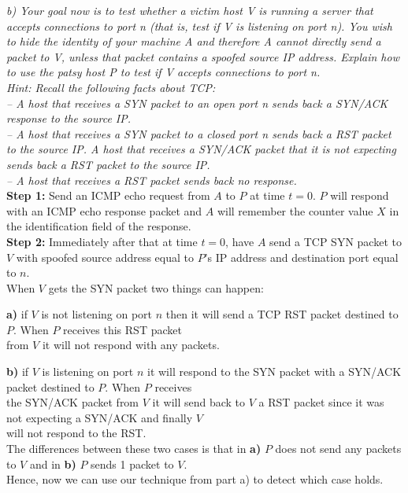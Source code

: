 \noindent \textit{b) Your goal now is to test whether a victim host V is running a server that accepts connections to port n (that is, test if V is listening on port n). You wish to hide the identity of your machine A and therefore A cannot directly send a packet to V, unless that packet contains a spoofed source IP address. Explain how to use the patsy host P to test if V accepts connections to port n.\\
Hint: Recall the following facts about TCP:\\
-- A host that receives a SYN packet to an open port n sends back a SYN/ACK response to the source IP.\\
-- A host that receives a SYN packet to a closed port n sends back a RST packet to the source IP.
A host that receives a SYN/ACK packet that it is not expecting sends back a RST packet to the source IP.\\
-- A host that receives a RST packet sends back no response. }\\

\noindent\textbf{Step 1: } Send an ICMP echo request from $A$ to $P$ at time $t=0$. $P$ will respond with an ICMP echo response packet and $A$ will remember the counter value $X$ in the identification field of the response.\\
\noindent\textbf{Step 2: } Immediately after that at time $t=0$, have $A$ send a TCP SYN packet to $V$ with spoofed source address equal to $P$'s IP address and destination port equal to $n$.\\

When $V$ gets the SYN packet two things can happen: 

\textbf{a)} if $V$ is not listening on port $n$ then it will send a TCP RST packet destined to $P$. When $P$ receives this RST packet\\\indent from $V$ it will not respond with any packets. 

\textbf{b)} if $V$ is listening on port $n$ it will respond to the SYN packet with a SYN/ACK packet destined to $P$. When $P$ receives\\\indent the SYN/ACK packet from $V$ it will send back to $V$ a RST packet since it was not expecting a SYN/ACK and finally $V$\\\indent will not respond to the RST. \\

The differences between these two cases is that in \textbf{a)} $P$ does not send any packets to $V$ and in \textbf{b)} $P$ sends 1 packet to $V$.\\\indent Hence, now we can use our technique from part a) to detect which case holds. \\

